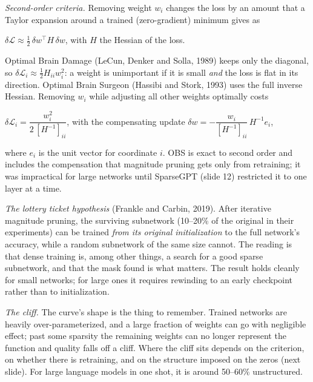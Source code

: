 \documentclass[11pt,letterpaper]{article}
\newenvironment{formulas}{\begin{tcolorbox}[formulabox]}{\end{tcolorbox}}
\begin{document}
\emph{Second-order criteria.} Removing weight $w_i$ changes the loss by an amount that a Taylor expansion around a trained (zero-gradient) minimum gives as
\begin{formulas}
$\delta\mathcal{L}\approx\tfrac12\,\delta w^\top H\,\delta w$, \quad with $H$ the Hessian of the loss.
\end{formulas}
Optimal Brain Damage (LeCun, Denker and Solla, 1989) keeps only the diagonal, so $\delta\mathcal{L}_i\approx\tfrac12H_{ii}w_i^2$: a weight is unimportant if it is small \emph{and} the loss is flat in its direction. Optimal Brain Surgeon (Hassibi and Stork, 1993) uses the full inverse Hessian. Removing $w_i$ while adjusting all other weights optimally costs
\begin{formulas}
$\delta\mathcal{L}_i=\dfrac{w_i^2}{2\,[H^{-1}]_{ii}}$, \qquad with the compensating update \quad $\delta w=-\dfrac{w_i}{[H^{-1}]_{ii}}\,H^{-1}e_i$,
\end{formulas}
where $e_i$ is the unit vector for coordinate $i$. OBS is exact to second order and includes the compensation that magnitude pruning gets only from retraining; it was impractical for large networks until SparseGPT (slide 12) restricted it to one layer at a time.

\emph{The lottery ticket hypothesis} (Frankle and Carbin, 2019). After iterative magnitude pruning, the surviving subnetwork (10--20\% of the original in their experiments) can be trained \emph{from its original initialization} to the full network's accuracy, while a random subnetwork of the same size cannot. The reading is that dense training is, among other things, a search for a good sparse subnetwork, and that the mask found is what matters. The result holds cleanly for small networks; for large ones it requires rewinding to an early checkpoint rather than to initialization.

\emph{The cliff.} The curve's shape is the thing to remember. Trained networks are heavily over-parameterized, and a large fraction of weights can go with negligible effect; past some sparsity the remaining weights can no longer represent the function and quality falls off a cliff. Where the cliff sits depends on the criterion, on whether there is retraining, and on the structure imposed on the zeros (next slide). For large language models in one shot, it is around 50--60\% unstructured.
\end{document}
